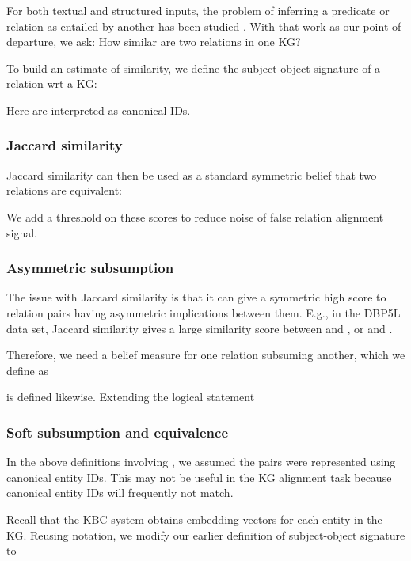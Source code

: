 \documentclass[11pt]{article}
\def\KG{\ensuremath{\text{KG}}}
\begin{document}
For both textual and structured inputs, the problem of inferring a predicate or relation as entailed by another has been studied \citep{lin2001dirt, bhagat-etal-2007-ledir, nakashole-etal-2012-patty}.  With that work as our point of departure, we ask: How similar are two relations  in one KG?

To build an estimate of similarity, we define the subject-object signature of a relation wrt a \KG:

Here  are interpreted as canonical IDs.


\subsubsection{Jaccard similarity}

Jaccard similarity can then be used as a standard symmetric belief that two relations are equivalent:


We add a threshold on these scores to reduce noise of false relation alignment signal. 


\subsubsection{Asymmetric subsumption}

The issue with Jaccard similarity is that it can give a symmetric high score to relation pairs having asymmetric implications between them.  E.g., in the DBP5L data set, Jaccard similarity gives a large similarity score between  and , or  and .

Therefore, we need a belief measure for one relation subsuming another, which we define as 

 is defined likewise.  Extending the logical statement


\subsubsection{Soft subsumption and equivalence}

In the above definitions involving , we assumed the  pairs were represented using canonical entity IDs.  This may not be useful in the KG alignment task because canonical entity IDs will frequently not match.

Recall that the KBC system obtains embedding vectors  for each entity  in the KG.  Reusing notation, we modify our earlier definition of subject-object signature to
\end{document}
